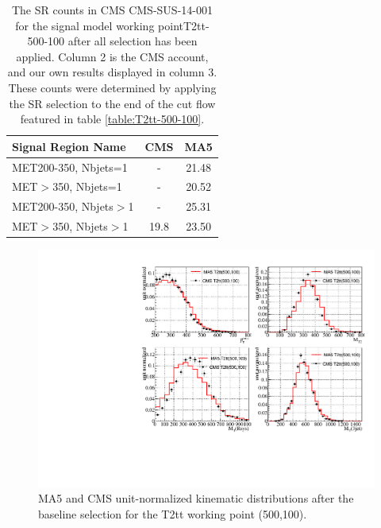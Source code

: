     \begin{table}
    \centering
    \caption{The SR counts in CMS CMS-SUS-14-001 for
    the signal model working pointT2tt-500-100 after all selection has been applied. Column 2 is the CMS account,
    and our own results displayed in column 3. These counts were determined by applying the SR selection to the end of the cut flow featured in table \ref{table:T2tt-500-100}.}
    \begin{tabular}{  l | c | c  }
    \hline
        \hline
    Signal Region Name & CMS & MA5\\
    \hline
    MET200-350,  Nbjets=1 & - & 21.48\\ 
 \hline 
MET$>$350,  Nbjets=1 & - & 20.52\\ 
 \hline 
MET200-350,  Nbjets$>$1 & - & 25.31\\ 
 \hline 
MET$>$350,  Nbjets$>$1 & 19.8 & 23.50\\ 
 \hline 
\hline
    \end{tabular}
    
    \end{table}
    
   \begin{figure}
  \centering
    \includegraphics[width=\textwidth]{figures/Appendices/Ma5ValidationSUS13012/T2tt-500-100.pdf}
  \caption{MA5 and CMS unit-normalized kinematic distributions after the baseline
    selection for the T2tt working point (500,100).}
\end{figure}


